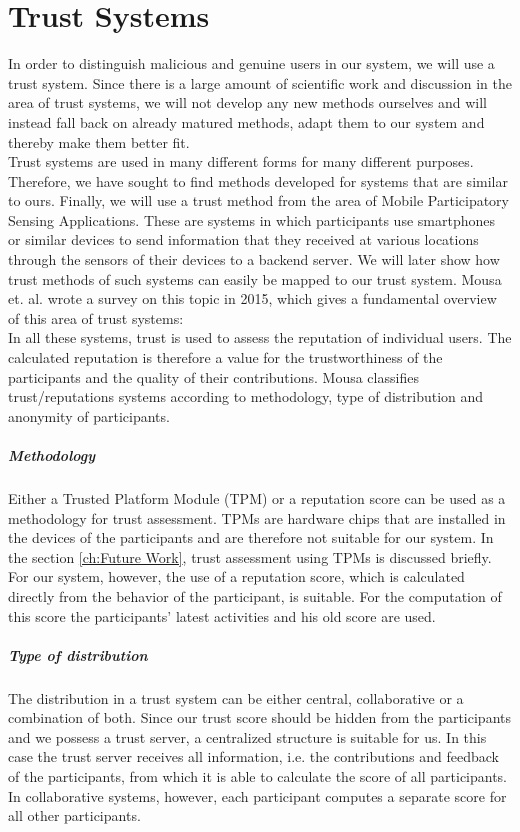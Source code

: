 \section{Trust Systems}\label{sec:Trust Systems}
In order to distinguish malicious and genuine users in our system, we will use a trust system. Since there is a large amount of scientific work and discussion in the area of trust systems, we will not develop any new methods ourselves and will instead fall back on already matured methods, adapt them to our system and thereby make them better fit.\\

Trust systems are used in many different forms for many different purposes. Therefore, we have sought to find methods developed for systems that are similar to ours. Finally, we will use a trust method from the area of Mobile Participatory Sensing Applications. These are systems in which participants use smartphones or similar devices to send information that they received at various locations through the sensors of their devices to a backend server. We will later show how trust methods of such systems can easily be mapped to our trust system. Mousa et. al. wrote a survey on this topic in 2015, which gives a fundamental overview of this area of trust systems\cite{mousa2015trust}:\\

In all these systems, trust is used to assess the reputation of individual users. The calculated reputation is therefore a value for the trustworthiness of the participants and the quality of their contributions. Mousa classifies trust/reputations systems according to methodology, type of distribution and anonymity of participants. 

\subparagraph{Methodology} Either a Trusted Platform Module (TPM) or a reputation score can be used as a methodology for trust assessment. TPMs are hardware chips that are installed in the devices of the participants and are therefore not suitable for our system. In the section \ref{ch:Future Work}, trust assessment using TPMs is discussed briefly. For our system, however, the use of a reputation score, which is calculated directly from the behavior of the participant, is suitable. For the computation of this score the participants' latest activities and his old score are used.

\subparagraph{Type of distribution} The distribution in a trust system can be either central, collaborative or a combination of both. Since our trust score should be hidden from the participants and we possess a trust server, a centralized structure is suitable for us. In this case the trust server receives all information, i.e. the contributions and feedback of the participants, from which it is able to calculate the score of all participants. In collaborative systems, however, each participant computes a separate score for all other participants.

